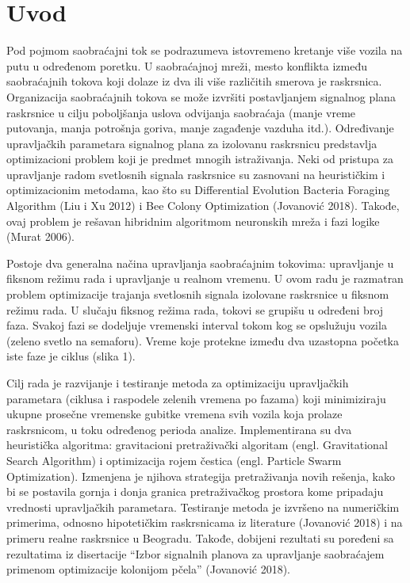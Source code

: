 \section{Uvod}

Pod pojmom saobraćajni tok se podrazumeva istovremeno kretanje više vozila na putu u određenom poretku. U saobraćajnoj mreži, mesto konflikta između saobraćajnih tokova koji dolaze iz dva ili više različitih smerova je raskrsnica. Organizacija saobraćajnih tokova se može izvršiti postavljanjem signalnog plana raskrsnice u cilju poboljšanja uslova odvijanja saobraćaja (manje vreme putovanja, manja potrošnja goriva, manje zagađenje vazduha itd.). Određivanje upravljačkih parametara signalnog plana za izolovanu raskrsnicu predstavlja optimizacioni problem koji je predmet mnogih istraživanja. Neki od pristupa za upravljanje radom svetlosnih signala raskrsnice su zasnovani na heurističkim i optimizacionim metodama, kao što su Differential Evolution Bacteria Foraging Algorithm (Liu i Xu 2012) i Bee Colony Optimization (Jovanović 2018). Takođe, ovaj problem je rešavan hibridnim algoritmom neuronskih mreža i fazi logike (Murat 2006).

\AuthorExHere

Postoje dva generalna načina upravljanja saobraćajnim tokovima: upravljanje u fiksnom režimu rada i upravljanje u realnom vremenu. U ovom radu je razmatran problem optimizacije trajanja svetlosnih signala izolovane raskrsnice u fiksnom režimu rada. U slučaju fiksnog režima rada, tokovi se grupišu u određeni broj faza. Svakoj fazi se dodeljuje vremenski interval tokom kog se opslužuju vozila (zeleno svetlo na semaforu). Vreme koje protekne između dva uzastopna početka iste faze je ciklus (slika 1).


Cilj rada je razvijanje i testiranje metoda za optimizaciju upravljačkih parametara (ciklusa i raspodele zelenih vremena po fazama) koji minimiziraju ukupne prosečne vremenske gubitke vremena svih vozila koja prolaze raskrsnicom, u toku određenog perioda analize. Implementirana su dva heuristička algoritma: gravitacioni pretraživački algoritam (engl. Gravitational Search Algorithm) i optimizacija rojem čestica (engl. Particle Swarm Optimization). Izmenjena je njihova strategija pretraživanja novih rešenja, kako bi se postavila gornja i donja granica pretraživačkog prostora kome pripadaju vrednosti upravljačkih parametara. Testiranje metoda je izvršeno na numeričkim primerima, odnosno hipotetičkim raskrsnicama iz literature (Jovanović 2018) i na primeru realne raskrsnice u Beogradu. Takođe, dobijeni rezultati su poređeni sa rezultatima iz disertacije “Izbor signalnih planova za upravljanje saobraćajem primenom optimizacije kolonijom pčela” (Jovanović 2018).

